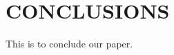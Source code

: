 \documentclass[letterpaper, 10 pt, conference]{ieeeconf}  %
\begin{document}
\label{sec:fut}

\section{CONCLUSIONS}

This is to conclude our paper. 

\newpage





\clearpage



\end{document}
